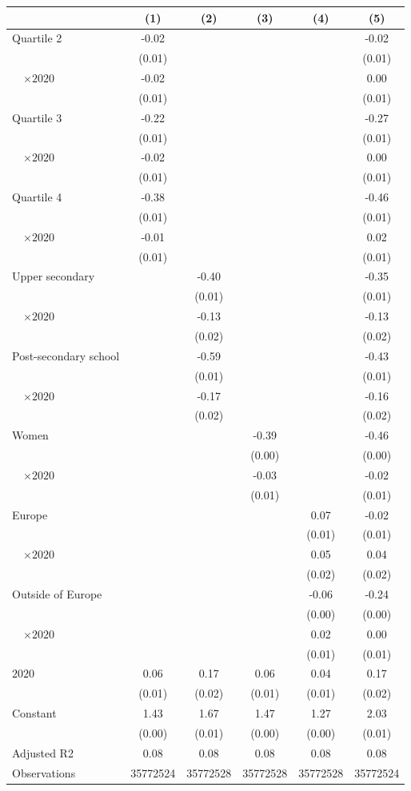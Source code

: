 
\begin{tabular}{@{}l*{5}{S[table-format={-}2.2{\tnote{***}}]}@{}}
\toprule
{} & {(1)} & {(2)} & {(3)} & {(4)} & {(5)}\tabularnewline%
\midrule
Quartile 2 & -0.02\tnote{***} &  &  &  & -0.02\tnote{*}\tabularnewline%
 & (0.01) &  &  &  & \vphantom{5} (0.01)\tabularnewline%
~~\(\times 2020\) & -0.02 &  &  &  & \vphantom{1} 0.00\tabularnewline%
 & (0.01) &  &  &  & \vphantom{4} (0.01)\tabularnewline%
Quartile 3 & -0.22\tnote{***} &  &  &  & -0.27\tnote{***}\tabularnewline%
 & (0.01) &  &  &  & \vphantom{3} (0.01)\tabularnewline%
~~\(\times 2020\) & -0.02 &  &  &  & 0.00\tabularnewline%
 & (0.01) &  &  &  & \vphantom{2} (0.01)\tabularnewline%
Quartile 4 & -0.38\tnote{***} &  &  &  & -0.46\tnote{***}\tabularnewline%
 & (0.01) &  &  &  & \vphantom{1} (0.01)\tabularnewline%
~~\(\times 2020\) & -0.01 &  &  &  & 0.02\tabularnewline%
 & (0.01) &  &  &  & (0.01)\tabularnewline%
Upper secondary &  & -0.40\tnote{***} &  &  & -0.35\tnote{***}\tabularnewline%
 &  & (0.01) &  &  & \vphantom{1} (0.01)\tabularnewline%
~~\(\times 2020\) &  & -0.13\tnote{***} &  &  & -0.13\tnote{***}\tabularnewline%
 &  & (0.02) &  &  & \vphantom{1} (0.02)\tabularnewline%
Post-secondary school &  & -0.59\tnote{***} &  &  & -0.43\tnote{***}\tabularnewline%
 &  & (0.01) &  &  & (0.01)\tabularnewline%
~~\(\times 2020\) &  & -0.17\tnote{***} &  &  & -0.16\tnote{***}\tabularnewline%
 &  & (0.02) &  &  & (0.02)\tabularnewline%
Women &  &  & -0.39\tnote{***} &  & -0.46\tnote{***}\tabularnewline%
 &  &  & (0.00) &  & (0.00)\tabularnewline%
~~\(\times 2020\) &  &  & -0.03\tnote{***} &  & -0.02\tnote{*}\tabularnewline%
 &  &  & (0.01) &  & (0.01)\tabularnewline%
Europe &  &  &  & 0.07\tnote{***} & -0.02\tnote{**}\tabularnewline%
 &  &  &  & (0.01) & \vphantom{1} (0.01)\tabularnewline%
~~\(\times 2020\) &  &  &  & 0.05\tnote{**} & 0.04\tnote{**}\tabularnewline%
 &  &  &  & (0.02) & (0.02)\tabularnewline%
Outside of Europe &  &  &  & -0.06\tnote{***} & -0.24\tnote{***}\tabularnewline%
 &  &  &  & (0.00) & (0.00)\tabularnewline%
~~\(\times 2020\) &  &  &  & 0.02\tnote{\dagger} & 0.00\tabularnewline%
 &  &  &  & (0.01) & (0.01)\tabularnewline%
\midrule
\(2020\) & 0.06\tnote{***} & 0.17\tnote{***} & 0.06\tnote{***} & 0.04\tnote{***} & 0.17\tnote{***}\tabularnewline%
 & (0.01) & (0.02) & (0.01) & (0.01) & (0.02)\tabularnewline%
Constant & 1.43\tnote{***} & 1.67\tnote{***} & 1.47\tnote{***} & 1.27\tnote{***} & 2.03\tnote{***}\tabularnewline%
 & (0.00) & (0.01) & (0.00) & (0.00) & (0.01)\tabularnewline%
\midrule
Adjusted R2 & 0.08 & 0.08 & 0.08 & 0.08 & 0.08\tabularnewline%
Observations & {\num{35772524}} & {\num{35772528}} & {\num{35772528}} & {\num{35772528}} & {\num{35772524}}\tabularnewline%
\bottomrule
\end{tabular}
